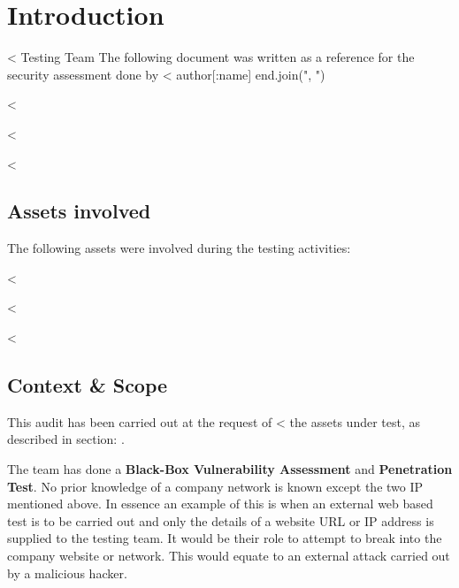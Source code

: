 

\chapter{Introduction}\label{ch:introduction}

  <%
         Testing Team %
  The following document was written as a reference for the security
  assessment done by <%
    author[:name]
  end.join(", ") %

  <%

    <%

  <%
  \section{Assets involved}\label{sec:assets}

    The following assets were involved during the testing activities:

    \begin{itemize}
      <%
        <%
          \item \textbf{<%
        <%
          \item \textbf{<%
        <%
      <%
    \end{itemize}

  <%

    <%

  <%
  \section{Context \& Scope}\label{sec:scope}

    This audit has been carried out at the request of
    <%
    the assets under test, as described in section: .

    The team has done a \textbf{Black-Box Vulnerability Assessment} and
    \textbf{Penetration Test}.
    No prior knowledge of a company network is known except the two IP mentioned
    above. In essence an example of this is when an external web based test is
    to be carried out and only the details of a website URL or IP address is
    supplied to the testing team. It would be their role to attempt to break
    into the company website or network.
    This would equate to an external attack carried out by a malicious hacker.

